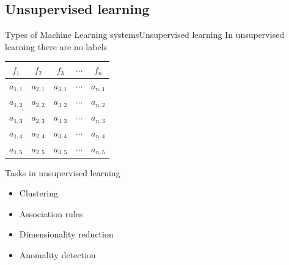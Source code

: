 \documentclass[10pt,compress]{beamer} %
\begin{document}
\subsection{Unsupervised learning}
\begin{frame}{Types of Machine Learning systems}{Unsupervised learning}
	In unsupervised learning there are no labels

	\begin{center}
	\begin{tabular}{ccccc}\hline
		 $f_1$     & $f_2$     & $f_3$     & $\cdots$ & $f_n$     \\\hline
		 $a_{1,1}$ & $a_{2,1}$ & $a_{3,1}$ & $\cdots$ & $a_{n,1}$ \\
		 $a_{1,2}$ & $a_{2,2}$ & $a_{3,2}$ & $\cdots$ & $a_{n,2}$ \\
		 $a_{1,3}$ & $a_{2,3}$ & $a_{3,3}$ & $\cdots$ & $a_{n,3}$ \\
		 $a_{1,4}$ & $a_{2,4}$ & $a_{3,4}$ & $\cdots$ & $a_{n,4}$ \\
		 $a_{1,5}$ & $a_{2,5}$ & $a_{3,5}$ & $\cdots$ & $a_{n,5}$ \\
		 \hline
	 \end{tabular}
	 \end{center}

	Tasks in unsupervised learning
	\begin{itemize}
		\item Clustering
		\item Association rules
		\item Dimensionality reduction
		\item Anomality detection
	\end{itemize}

\end{frame}
\end{document}

